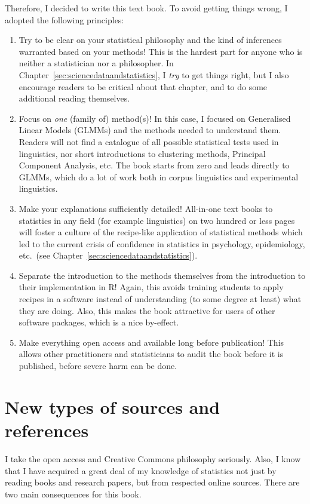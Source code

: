 Therefore, I decided to write this text book.
To avoid getting things wrong, I adopted the following principles:

\begin{enumerate}
  \item Try to be clear on your statistical philosophy and the kind of inferences warranted based on your methods!
    This is the hardest part for anyone who is neither a statistician nor a philosopher.
    In Chapter~\ref{sec:sciencedataandstatistics}, I \textit{try} to get things right, but I also encourage readers to be critical about that chapter, and to do some additional reading themselves.
  \item Focus on \textit{one} (family of) method(s)!
    In this case, I focused on Generalised Linear Models (GLMMs) and the methods needed to understand them.
    Readers will not find a catalogue of all possible statistical tests used in linguistics, nor short introductions to clustering methods, Principal Component Analysis, etc.
    The book starts from zero and leads directly to GLMMs, which do a lot of work both in corpus linguistics and experimental linguistics.
  \item Make your explanations sufficiently detailed!
    All-in-one text books to statistics in any field (for example linguistics) on two hundred or less pages will foster a culture of the recipe-like application of statistical methods which led to the current crisis of confidence in statistics in psychology, epidemiology, etc.\ (see Chapter~\ref{sec:sciencedataandstatistics}).
  \item Separate the introduction to the methods themselves from the introduction to their implementation in R!
    Again, this avoids training students to apply recipes in a software instead of understanding (to some degree at least) what they are doing.
    Also, this makes the book attractive for users of other software packages, which is a nice by-effect.
  \item Make everything open access and available long before publication!
    This allows other practitioners and statisticians to audit the book before it is published, \ie before severe harm can be done.
\end{enumerate}

\section*{New types of sources and references}

I take the open access and Creative Commons philosophy seriously.
Also, I know that I have acquired a great deal of my knowledge of statistics not just by reading books and research papers, but from respected online sources.
There are two main consequences for this book.

